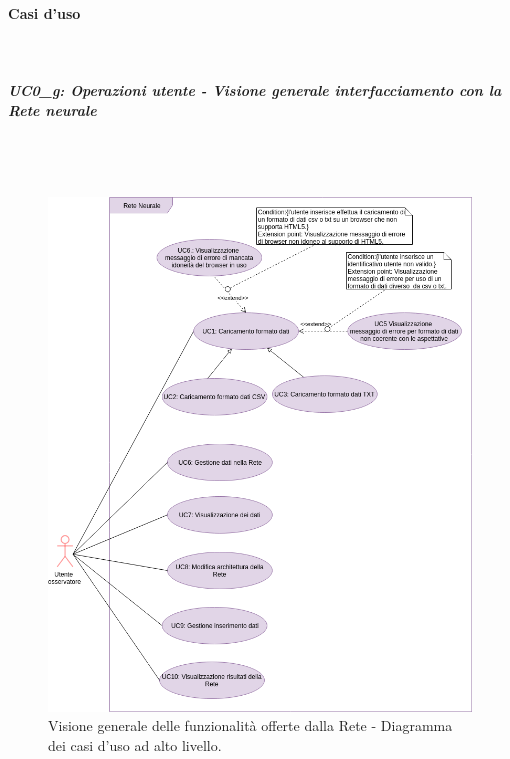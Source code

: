 \paragraph{Casi d'uso}\mbox{}\\
\label{Casi d'uso}
\noindent
\subparagraph{UC0\_g: Operazioni utente - Visione generale interfacciamento con la Rete neurale}\mbox{}\\\\
\label{UC0_g: Operazioni utente - Visione generale interfacciamento con la Rete neurale}
\begin{figure}[H]
\centering
	\includegraphics[width=1\linewidth]{./image/visione_generale.png}
	\caption{Visione generale delle funzionalit\`a offerte dalla Rete - Diagramma dei casi d'uso ad alto livello.}
	\label{Visione generale delle funzionalita offerte dalla Rete.}
\end{figure}
\noindent
